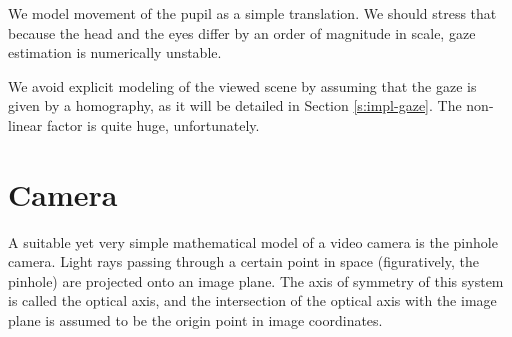 We model movement of the pupil as a simple translation.
We should stress that because the head and the eyes differ by an order of magnitude in scale, gaze estimation is numerically unstable.

We avoid explicit modeling of the viewed scene by assuming that the gaze is given by a homography, as it will be detailed in Section \ref{s:impl-gaze}.
The non-linear factor is quite huge, unfortunately.

\section{Camera}

A suitable yet very simple mathematical model of a video camera is the pinhole camera.
Light rays passing through a certain point in space (figuratively, the pinhole) are projected onto an image plane.
The axis of symmetry of this system is called the optical axis, and the intersection of the optical axis with the image plane is assumed to be the origin point in image coordinates.

